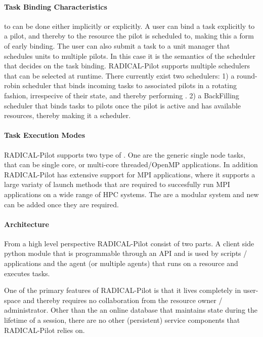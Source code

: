 \documentclass{sig-alternate}
\begin{document}
\paragraph{Task Binding Characteristics}

 to   can be done either implicitly
or explicitly.
A user can bind a task explicitly to a pilot, and thereby to the resource the
pilot is scheduled to, making this a form of early binding.
The user can also submit a task to a unit manager that schedules units to
multiple pilots.
In this case it is the semantics of the scheduler that decides on the task
binding.
RADICAL-Pilot supports multiple schedulers that can be selected at runtime.
There currently exist two schedulers:
1) a round-robin scheduler that binds incoming tasks to associated pilots in a
rotating fashion, irrespecive of their state, and thereby performing
.
2) a BackFilling scheduler that binds tasks to pilots once the pilot is active
and has available resources, thereby making it a 
scheduler.

\paragraph{Task Execution Modes}

RADICAL-Pilot supports two type of .
One are the generic single node tasks, that can be single core, or multi-core
threaded/OpenMP applications.
In addition RADICAL-Pilot has extensive support for MPI applications, where it
supports a large variaty of launch methods that are required to succesfully run
MPI applications on a wide range of HPC systems.
The  are a modular system and new  can be added once they are required.

\paragraph{Architecture}

From a high level perspective RADICAL-Pilot consist of two parts.
A client side python module that is programmable through an API and is used by
scripts / applications and the agent (or multiple agents) that runs on a
resource and executes tasks.

One of the primary features of RADICAL-Pilot is that it lives completely in
user-space and thereby requires no collaboration from the resource owner /
administrator.
Other than the an online database that maintains state during the lifetime of a
session, there are no other (persistent) service components that RADICAL-Pilot
relies on.
\end{document}

